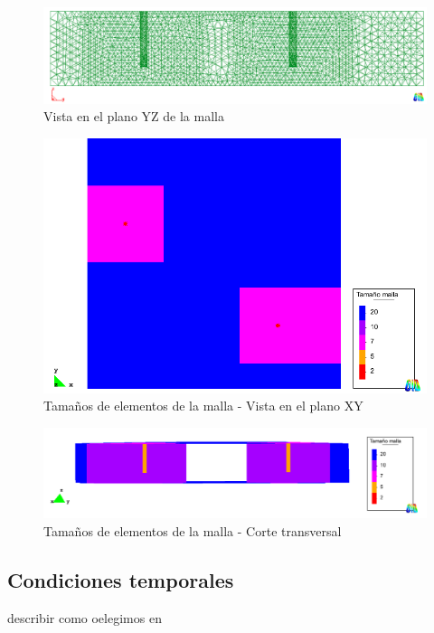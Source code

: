 \documentclass[10pt,a4paper,final]{article}
\begin{document}
\begin{figure}[tbhp]
\centerline{\includegraphics[scale=0.50]{img/contorno_malla_yz1}}
\caption{Vista en el plano YZ de la malla}
\label{contorno_malla_yz1}
\end{figure}

\begin{figure}[tbhp]
\centerline{\includegraphics[scale=0.50]{img/tam_malla_xy}}
\caption{Tamaños de elementos de la malla - Vista en el plano XY}
\label{tam_malla_xy}
\end{figure}

\begin{figure}[tbhp]
\centerline{\includegraphics[scale=0.50]{img/tam_malla_pozo_interior}}
\caption{Tamaños de elementos de la malla - Corte transversal}
\label{tam_malla_pozo_interior}
\end{figure}
%
\subsection{Condiciones temporales}
describir como oelegimos en
%
%
\end{document}
